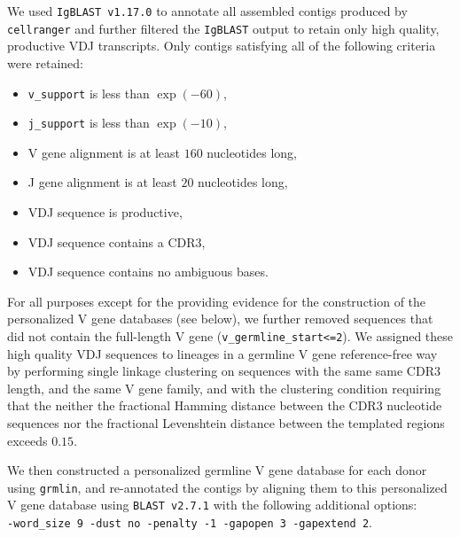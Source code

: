 We used \verb|IgBLAST v1.17.0| to annotate all assembled contigs produced by \verb|cellranger| and further filtered the \verb|IgBLAST| output to retain only high quality, productive VDJ transcripts. Only contigs satisfying all of the following criteria were retained:
\begin{itemize}
    \item \verb|v_support| is less than $ \exp({-60})$,
    \item \verb|j_support| is less than $ \exp({-10})$,
    \item  V gene alignment is at least $ 160$ nucleotides long,
    \item  J gene alignment is at least $ 20$ nucleotides long,
    \item VDJ sequence is productive,
    \item VDJ sequence contains a CDR3,
    \item VDJ sequence contains no ambiguous bases.
\end{itemize}
For all purposes except for the providing evidence for the construction of the personalized V gene databases (see below), we further removed sequences that did not contain the full-length V gene (\verb|v_germline_start<=2|). We assigned these high quality VDJ sequences to lineages in a germline V gene reference-free way by performing single linkage clustering on sequences with the same same CDR3 length, and the same V gene family, and with the clustering condition requiring that the neither the fractional Hamming distance between the CDR3 nucleotide sequences nor the fractional Levenshtein distance between the templated regions exceeds $0.15$.

We then constructed a personalized germline V gene database for each donor using \verb|grmlin|, and re-annotated the contigs by aligning them to this personalized V gene database using \verb|BLAST v2.7.1| with the following additional options: \newline \verb|     -word_size 9 -dust no |\verb|-penalty -1 -gapopen 3 -gapextend 2|. \hfill \\ 

